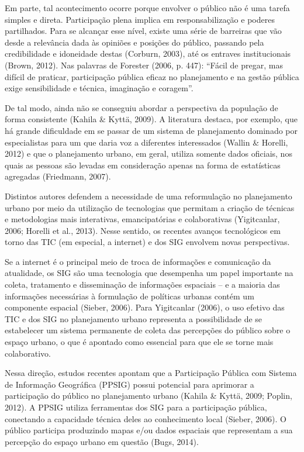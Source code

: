 \documentclass{article}
\begin{document}
\begin{multicols}{2}
Em parte, tal acontecimento ocorre porque envolver o público não é uma tarefa
simples
e direta. Participação plena implica em responsabilização e poderes partilhados.
Para se alcançar esse nível, existe uma série de barreiras que vão desde a
relevância dada às opiniões e posições do público, passando pela credibilidade e
idoneidade destas (Corburn, 2003), até os
entraves institucionais (Brown, 2012). Nas
palavras de Forester (2006, p. 447): “Fácil
de pregar, mas difícil de praticar, participação pública eficaz no planejamento
e na
gestão pública exige sensibilidade e técnica, imaginação e coragem”.

De tal modo, ainda não se conseguiu abordar a perspectiva da população de forma
consistente (Kahila \& Kyttä, 2009). A
literatura destaca, por exemplo, que há grande dificuldade em se passar de um
sistema de planejamento dominado por especialistas para um que daria voz a
diferentes interessados (Wallin \& Horelli,
2012) e que o planejamento urbano, em geral, utiliza somente dados
oficiais, nos quais as pessoas são levadas em consideração apenas na forma de
estatísticas agregadas (Friedmann,
2007).

Distintos autores defendem a necessidade de uma reformulação no planejamento
urbano
por meio da utilização de tecnologias que permitam a criação de técnicas e
metodologias mais interativas, emancipatórias e colaborativas (Yigitcanlar,
2006; Horelli et
al., 2013). Nesse sentido, os recentes avanços tecnológicos em torno das
TIC (em especial, a internet) e dos SIG envolvem novas perspectivas.

Se a internet é o principal meio de troca de informações e comunicação da
atualidade,
os SIG são uma tecnologia que desempenha um papel importante na coleta,
tratamento e
disseminação de informações espaciais – e a maioria das informações necessárias
à
formulação de políticas urbanas contém um componente espacial (Sieber, 2006).
Para Yigitcanlar (2006), o uso efetivo das TIC e dos SIG no planejamento
urbano representa a possibilidade de se estabelecer um sistema permanente de
coleta
das percepções do público sobre o espaço urbano, o que é apontado como essencial
para que ele se torne mais colaborativo.

Nessa direção, estudos recentes apontam que a Participação Pública com Sistema
de
Informação Geográfica (PPSIG) possui potencial para aprimorar a participação do
público no planejamento urbano (Kahila \& Kyttä,
2009; Poplin, 2012). A PPSIG
utiliza ferramentas dos SIG para a participação pública, conectando a capacidade
técnica deles ao conhecimento local (Sieber,
2006). O público participa produzindo mapas e/ou dados espaciais que
representam a sua percepção do espaço urbano em questão (Bugs, 2014).


\end{multicols}
\end{document}
